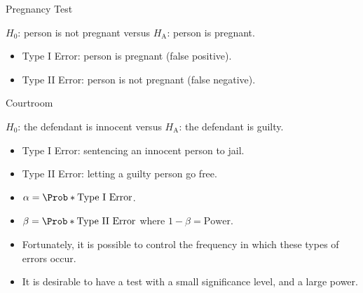 \begin{Example}{Pregnancy Test}{}
      \centerline{$ H_0 $: person is not pregnant versus $ H_\text{A} $: person is pregnant.}
      \begin{itemize}
            \item Type I Error: person is pregnant (false positive).
            \item Type II Error: person is not pregnant (false negative).
      \end{itemize}
\end{Example}
\begin{Example}{Courtroom}{}
      \centerline{$ H_0 $: the defendant is innocent versus $ H_\text{A} $: the defendant is guilty.}
      \begin{itemize}
            \item Type I Error: sentencing an innocent person to jail.
            \item Type II Error: letting a guilty person go free.
      \end{itemize}
\end{Example}
\begin{itemize}
      \item $ \alpha=\Prob*{\text{Type I Error}} $.
      \item $ \beta=\Prob*{\text{Type II Error}} $
            where $ 1-\beta=\text{Power} $.
      \item Fortunately, it is possible to control the frequency in which these types of errors
            occur.
      \item It is desirable to have a test with a small significance level, and a large power.
\end{itemize}
